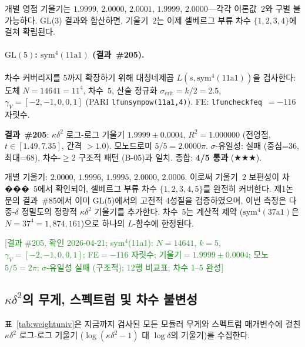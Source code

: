 \documentclass[11pt, a4paper]{article}
\theoremstyle{plain}
\theoremstyle{definition}
\begin{document}
개별 영점 기울기는 $1.9999$, $2.0000$, $2.0001$, $1.9999$,
$2.0000$---각각 이론값~$2$와 구별 불가능하다.
GL(3) 결과와 합산하면, 기울기~$2$는 이제 셀베르그 부류
차수 $\{1,2,3,4\}$에 걸쳐 확립된다.

\paragraph{$\mathrm{GL}(5)$: $\mathrm{sym}^{4}(\text{11a1})$
(결과~\#205).}
\label{par:gl5sym4}
차수 커버리지를 $5$까지 확장하기 위해 대칭네제곱
$L(s,\mathrm{sym}^4(\text{11a1}))$을 검사한다: 도체 $N=14641=11^4$,
차수~$5$, 산술 정규화 $\sigma_{\mathrm{crit}}=k/2=2.5$,
$\gamma_V=[-2,-1,0,0,1]$ (PARI \texttt{lfunsympow(11a1,4)}).
FE: \texttt{lfuncheckfeq}~$=-116$ 자릿수.

\medskip
\noindent\textbf{결과~\#205}: $\kappa\delta^{2}$ 로그-로그 기울기
$\mathbf{1.9999\pm 0.0004}$, $R^{2}=1.000000$ (전영점, $t\in[1.49, 7.35]$,
간격 $>1.0$).
모노드로미 $5/5=2.0000\pi$.
$\sigma$-유일성: 실패 (중심=36, 최대=68),
차수-${\geq}2$ 구조적 패턴 (B-05)과 일치.
종합: \textbf{4/5 통과} ($\bigstar\bigstar\bigstar$).

개별 기울기: $2.0000$, $1.9996$, $1.9995$, $2.0000$, $2.0006$.
이로써 기울기~$2$ 보편성이 차���~$5$에서 확인되어,
셀베르그 부류 차수 $\{1,2,3,4,5\}$를 완전히 커버한다.
제1논문의 결과~\#85에서 이미 GL(5)에서의 고전적 4성질을 검증하였으며,
이번 측정은 다중-$\delta$ 정밀도의 정량적 $\kappa\delta^{2}$ 기울기를 추가한다.
차수~$5$는 계산적 제약 ($\mathrm{sym}^4(\text{37a1})$은 $N=37^4=1{,}874{,}161$)으로
하나의 $L$-함수에 한정된다.

\textcolor{ForestGreen}{[결과 \#205, 확인 2026-04-21;
sym$^4$(11a1): $N{=}14641$, $k{=}5$, $\gamma_V{=}[-2,-1,0,0,1]$;
FE${=}-116$ 자릿수; 기울기${=}1.9999{\pm}0.0004$; 모노 $5/5{=}2\pi$;
$\sigma$-유일성 실패 (구조적); 12행 비교표; 차수 1--5 완성]}


\subsection{$\kappa\delta^{2}$의 무게, 스펙트럼 및 차수 불변성}
\label{ssec:weightinv}

표~\ref{tab:weightuniv}은 지금까지 검사된 모든 모듈러 무게와 스펙트럼 매개변수에
걸친 $\kappa\delta^{2}$ 로그-로그 기울기
($\log(\kappa\delta^{2}-1)$ 대 $\log\delta$의 기울기)를 수집한다.
\end{document}
